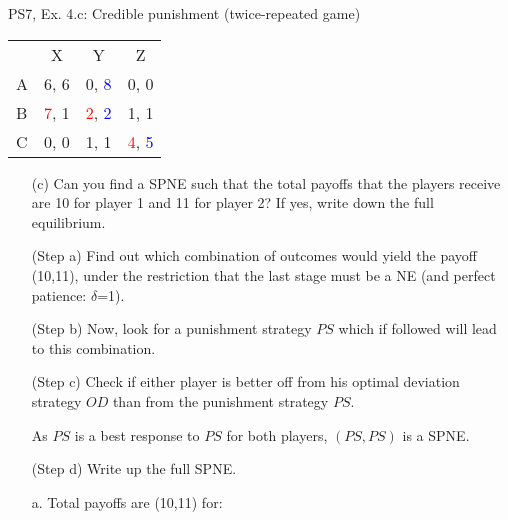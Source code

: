 \begin{frame}{PS7, Ex. 4.c: Credible punishment (twice-repeated game)}
    \vspace{-2pt}
    \begin{table}
      \begin{tabular}{l|c|c|c|}
        \multicolumn{1}{c}{} & \multicolumn{1}{c}{X} & \multicolumn{1}{c}{Y} & \multicolumn{1}{c}{Z}\\\cline{2-4}
        A   & 6, 6 &  0, \textcolor{blue}{8} &  0, 0  \\\cline{2-4}
        B & \textcolor{red}{7}, 1  & \textcolor{red}{2}, \textcolor{blue}{2} &  1, 1  \\\cline{2-4}
        C & 0, 0  & 1, 1 &  \textcolor{red}{4}, \textcolor{blue}{5}  \\\cline{2-4}
      \end{tabular}
    \end{table}
    \vspace{-4pt}
    \begin{itemize}
        \item[(c)] Can you find a SPNE such that the total payoffs that the players receive are 10 for player 1 and 11 for player 2? If yes, write down the full equilibrium.
    \end{itemize}
    \vspace{-8pt}
    \begin{multicols}{2}
      \begin{itemize}
        \item[(Step a)] Find out which combination of outcomes would yield the payoff (10,11), under the restriction that the last stage must be a NE (and perfect patience: $\delta$=1).
        \item[(Step b)] Now, look for a punishment strategy $PS$ which if followed will lead to this combination.
        \item[(Step c)] Check if either player is better off from his optimal deviation strategy $OD$ than from the punishment strategy $PS$.
        \item[]         As $PS$ is a best response to $PS$ for both players, $(PS,PS)$ is a SPNE.
        \item[(Step d)] Write up the full SPNE.
      \end{itemize}
      \vfill\null\columnbreak
      \begin{enumerate}
        \item[a.] Total payoffs are (10,11) for:
        \begin{itemize}\normalsize

\end{itemize}
\end{enumerate}
\end{multicols}
\end{frame}
